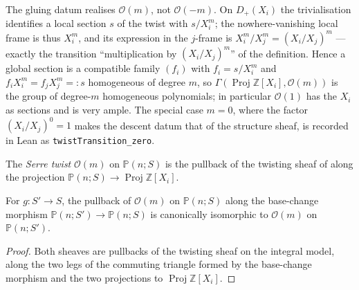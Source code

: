 \begin{remark}
  \label{rem:serre_twist_sign}
  The gluing datum realises \(\mathcal{O}(m)\), not \(\mathcal{O}(-m)\).  On
  \(D_+(X_i)\) the trivialisation identifies a local section \(s\) of the twist
  with \(s/X_i^m\); the nowhere-vanishing local frame is thus \(X_i^m\), and its
  expression in the \(j\)-frame is \(X_i^m/X_j^m = (X_i/X_j)^m\) — exactly the
  transition ``multiplication by \((X_i/X_j)^m\)'' of the definition.  Hence a
  global section is a compatible family \((f_i)\) with \(f_i = s/X_i^m\) and
  \(f_i X_i^m = f_j X_j^m =: s\) homogeneous of degree \(m\), so
  \(\Gamma(\operatorname{Proj}\mathbb{Z}[X_i], \mathcal{O}(m))\) is the group of
  degree-\(m\) homogeneous polynomials; in particular \(\mathcal{O}(1)\) has the
  \(X_i\) as sections and is very ample.  The special case \(m = 0\), where the
  factor \((X_i/X_j)^0 = 1\) makes the descent datum that of the structure sheaf,
  is recorded in Lean as \texttt{twistTransition\_zero}.
\end{remark}

\begin{definition}
  \label{def:twisting_sheaf}
  \leanok
  The \emph{Serre twist} \(\mathcal{O}(m)\) on \(\mathbb{P}(n; S)\) is the
  pullback of the twisting sheaf of  along the
  projection \(\mathbb{P}(n; S) \to \operatorname{Proj} \mathbb{Z}[X_i]\).
\end{definition}

\begin{lemma}
  \label{lem:twisting_sheaf_base_change}
  \leanok
  For \(g : S' \to S\), the pullback of \(\mathcal{O}(m)\) on
  \(\mathbb{P}(n; S)\) along the base-change morphism
  \(\mathbb{P}(n; S') \to \mathbb{P}(n; S)\) is canonically isomorphic to
  \(\mathcal{O}(m)\) on \(\mathbb{P}(n; S')\).
\end{lemma}

\begin{proof}
  \leanok
  Both sheaves are pullbacks of the twisting sheaf on the integral model,
  along the two legs of the commuting triangle formed by the base-change
  morphism and the two projections to
  \(\operatorname{Proj} \mathbb{Z}[X_i]\).
\end{proof}


